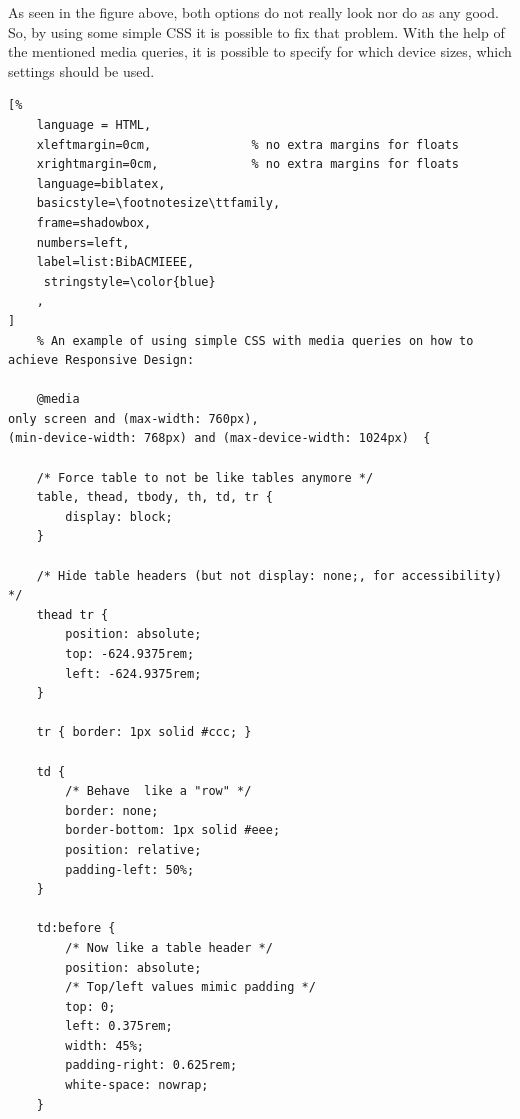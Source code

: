 As seen in the figure above, both options do not really look nor do as any good.
So, by using some simple CSS it is possible to fix that problem. With the help of the mentioned
media queries, it is possible to specify for which device sizes, which settings should be used. 

\begin{lstlisting}[%
    language = HTML, 
    xleftmargin=0cm,              % no extra margins for floats
    xrightmargin=0cm,             % no extra margins for floats
    language=biblatex,
    basicstyle=\footnotesize\ttfamily,
    frame=shadowbox,
    numbers=left,
    label=list:BibACMIEEE,
     stringstyle=\color{blue}
    ,
]
    % An example of using simple CSS with media queries on how to achieve Responsive Design:

    @media 
only screen and (max-width: 760px),
(min-device-width: 768px) and (max-device-width: 1024px)  {

	/* Force table to not be like tables anymore */
	table, thead, tbody, th, td, tr { 
		display: block; 
	}
	
	/* Hide table headers (but not display: none;, for accessibility) */
	thead tr { 
		position: absolute;
		top: -624.9375rem;
		left: -624.9375rem;
	}
	
	tr { border: 1px solid #ccc; }
	
	td { 
		/* Behave  like a "row" */
		border: none;
		border-bottom: 1px solid #eee; 
		position: relative;
		padding-left: 50%; 
	}
	
	td:before { 
		/* Now like a table header */
		position: absolute;
		/* Top/left values mimic padding */
		top: 0;
		left: 0.375rem;
		width: 45%;
		padding-right: 0.625rem;
		white-space: nowrap;
	}

\end{lstlisting}

